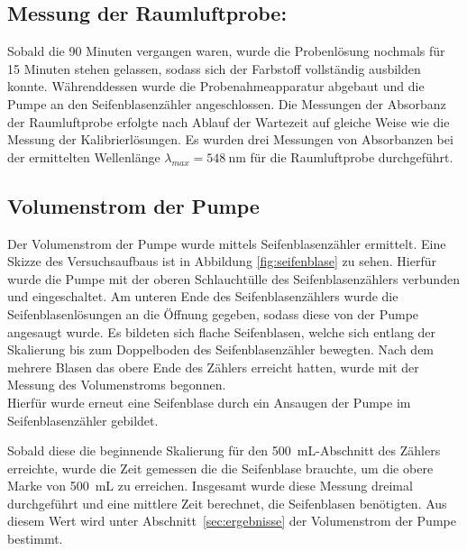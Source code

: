 \subsection*{Messung der Raumluftprobe:}
Sobald die 90 Minuten vergangen waren, wurde die Probenlösung nochmals für 15 Minuten stehen gelassen, sodass sich der Farbstoff vollständig ausbilden konnte. Währenddessen wurde die Probenahmeapparatur abgebaut und die Pumpe an den Seifenblasenzähler angeschlossen.
Die Messungen der Absorbanz der Raumluftprobe erfolgte nach Ablauf der Wartezeit auf gleiche Weise wie die Messung der Kalibrierlösungen. Es wurden drei Messungen von Absorbanzen bei der ermittelten Wellenlänge $\lambda_{max}=\SI{548}{\nano\meter}$ für die Raumluftprobe durchgeführt.

\subsection*{Volumenstrom der Pumpe}
Der Volumenstrom der Pumpe wurde mittels Seifenblasenzähler ermittelt. Eine Skizze des Versuchsaufbaus ist in Abbildung \ref{fig:seifenblase} zu sehen. Hierfür wurde die Pumpe mit der oberen Schlauchtülle des Seifenblasenzählers verbunden und eingeschaltet. Am unteren Ende des Seifenblasenzählers wurde die Seifenblasenlösungen an die Öffnung gegeben, sodass diese von der Pumpe angesaugt wurde. Es bildeten sich flache Seifenblasen, welche sich entlang der Skalierung bis zum Doppelboden des Seifenblasenzähler bewegten. Nach dem mehrere Blasen das obere Ende des Zählers erreicht hatten, wurde mit der Messung des Volumenstroms begonnen.\\
Hierfür wurde erneut eine Seifenblase durch ein Ansaugen der Pumpe im Seifenblasenzähler gebildet. 

Sobald diese die beginnende Skalierung für den \SI{500}{\milli \liter}-Abschnitt des Zählers erreichte, wurde die Zeit gemessen die die Seifenblase brauchte, um die obere Marke von \SI{500}{\milli \liter} zu erreichen. Insgesamt wurde diese Messung dreimal durchgeführt und eine mittlere Zeit berechnet, die Seifenblasen benötigten. Aus diesem Wert wird unter \mbox{Abschnitt \ref{sec:ergebnisse}} der Volumenstrom der Pumpe bestimmt.

